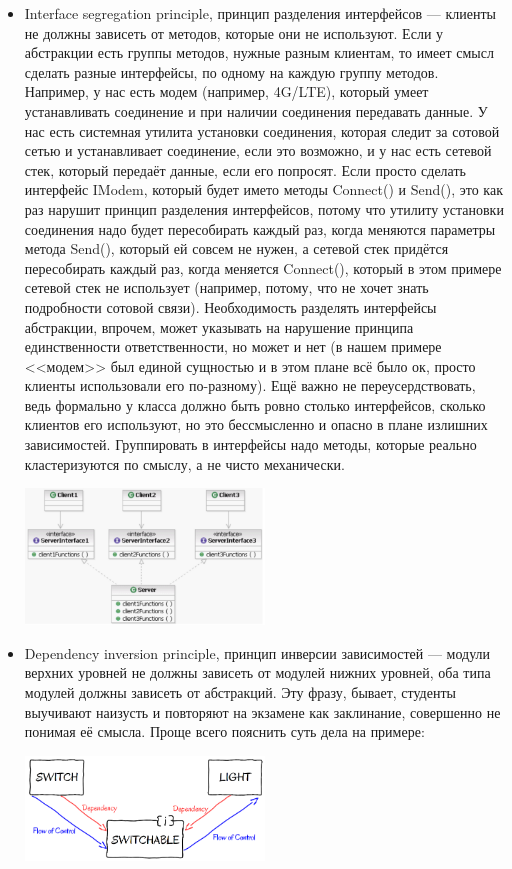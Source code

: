 \documentclass[a5paper]{article}
\begin{document}
\begin{itemize}
    \item Interface segregation principle, принцип разделения интерфейсов --- клиенты не должны зависеть от методов, которые они не используют. Если у абстракции есть группы методов, нужные разным клиентам, то имеет смысл сделать разные интерфейсы, по одному на каждую группу методов. Например, у нас есть модем (например, 4G/LTE), который умеет устанавливать соединение и при наличии соединения передавать данные. У нас есть системная утилита установки соединения, которая следит за сотовой сетью и устанавливает соединение, если это возможно, и у нас есть сетевой стек, который передаёт данные, если его попросят. Если просто сделать интерфейс IModem, который будет името методы Connect() и Send(), это как раз нарушит принцип разделения интерфейсов, потому что утилиту установки соединения надо будет пересобирать каждый раз, когда меняются параметры метода Send(), который ей совсем не нужен, а сетевой стек придётся пересобирать каждый раз, когда меняется Connect(), который в этом примере сетевой стек не использует (например, потому, что не хочет знать подробности сотовой связи). Необходимость разделять интерфейсы абстракции, впрочем, может указывать на нарушение принципа единственности ответственности, но может и нет (в нашем примере <<модем>> был единой сущностью и в этом плане всё было ок, просто клиенты использовали его по-разному). Ещё важно не переусердствовать, ведь формально у класса должно быть ровно столько интерфейсов, сколько клиентов его используют, но это бессмысленно и опасно в плане излишних зависимостей. Группировать в интерфейсы надо методы, которые реально кластеризуются по смыслу, а не чисто механически.
        \begin{center}
            \includegraphics[width=0.5\textwidth]{interfaceSegregationPrinciple.png}
        \end{center}
    \item Dependency inversion principle, принцип инверсии зависимостей --- модули верхних уровней не должны зависеть от модулей нижних уровней, оба типа модулей должны зависеть от абстракций. Эту фразу, бывает, студенты выучивают наизусть и повторяют на экзамене как заклинание, совершенно не понимая её смысла. Проще всего пояснить суть дела на примере:
        \begin{center}
            \includegraphics[width=0.5\textwidth]{dependencyInversionPrinciple.png}
        \end{center}


\end{itemize}
\end{document}

